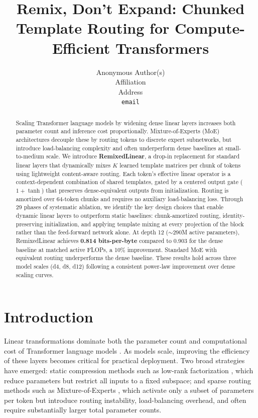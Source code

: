 \documentclass{article}
\title{Remix, Don't Expand: Chunked Template Routing for Compute-Efficient Transformers}
\author{%
  Anonymous Author(s)\\
  Affiliation\\
  Address\\
  \texttt{email}
}
\begin{document}
\maketitle

\begin{abstract}
Scaling Transformer language models by widening dense linear layers increases both parameter count and inference cost proportionally. Mixture-of-Experts (MoE) architectures decouple these by routing tokens to discrete expert subnetworks, but introduce load-balancing complexity and often underperform dense baselines at small-to-medium scale. We introduce \textbf{RemixedLinear}, a drop-in replacement for standard linear layers that dynamically mixes $K$ learned template matrices per chunk of tokens using lightweight content-aware routing. Each token's effective linear operator is a context-dependent combination of shared templates, gated by a centered output gate ($1 + \tanh$) that preserves dense-equivalent outputs from initialization. Routing is amortized over 64-token chunks and requires no auxiliary load-balancing loss. Through 29 phases of systematic ablation, we identify the key design choices that enable dynamic linear layers to outperform static baselines: chunk-amortized routing, identity-preserving initialization, and applying template mixing at every projection of the block rather than the feed-forward network alone. At depth 12 ($\sim$290M active parameters), RemixedLinear achieves \textbf{0.814 bits-per-byte} compared to 0.903 for the dense baseline at matched active FLOPs, a 10\% improvement. Standard MoE with equivalent routing underperforms the dense baseline. These results hold across three model scales (d4, d8, d12) following a consistent power-law improvement over dense scaling curves.
\end{abstract}

\section{Introduction}

Linear transformations dominate both the parameter count and computational cost of Transformer language models \citep{vaswani2017attention}. As models scale, improving the efficiency of these layers becomes critical for practical deployment. Two broad strategies have emerged: static compression methods such as low-rank factorization \citep{hu2021lora}, which reduce parameters but restrict all inputs to a fixed subspace; and sparse routing methods such as Mixture-of-Experts \citep{shazeer2017outrageously, fedus2022switch}, which activate only a subset of parameters per token but introduce routing instability, load-balancing overhead, and often require substantially larger total parameter counts.
\end{document}
